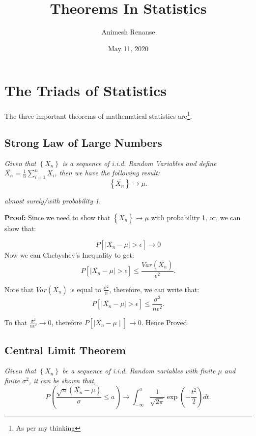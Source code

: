 \documentclass[a4paper]{article}
\title{Theorems In Statistics}
\author{Animesh Renanse}
\date{May 11, 2020}
\begin{document}
\maketitle
\newpage


\section{The Triads of  Statistics}

The three important theorems of mathematical statistics are\footnote{As per my thinking}.

\subsection{Strong Law of Large Numbers}

\textit{Given that $\left\{ X_n \right\} $ is a sequence of i.i.d. Random Variables and define $\overline{X_n} = \frac{1}{n}\sum_{i=1}^{n} X_i$, then we have the following result:}
\[
		\left\{ \overline{X_n} \right\}	\to \mu 	
.\]

\textit{almost surely/with probability 1}.


\textbf{Proof:} Since we need to show that $\left\{ \overline{X_n} \right\} \to \mu $ with probability 1, or, we can show that:

\[
		P \left[  \mid \overline{X_n}- \mu  \mid >  \epsilon  \right] \to  0
\]		
Now we can Chebyshev's Inequality to get:
\[
	P \left[  \mid \overline{X_n} - \mu  \mid > \epsilon \right] \le \frac{Var(\overline{X_n})}{\epsilon^{2}} 
.\] 

Note that $Var(\overline{X_n})$ is equal to $\frac{\sigma^2}{n}$, therefore, we can write that:
\[
	P \left[  \mid \overline{X_n} - \mu  \mid > \epsilon \right] \le \frac{\sigma^2}{n\epsilon^{2}} 
.\] 

To that $\frac{\sigma^2}{n\epsilon^2} \to 0$, therefore $P \left[  \mid \overline{X_n} - \mu  \mid  \right] \to 0 $.
Hence Proved.


\subsection{Central Limit Theorem}
\textit{Given that $\left\{ X_n \right\} $ be a sequence of i.i.d. Random variables with finite  $\mu$ and finite $\sigma^{2}$, it can be shown that,}
\[
P \left( \frac{\sqrt{n}\left( \overline{X_n} - \mu \right) } {\sigma}\le a \right) \to \int_{-\infty}^{a} \frac{1}{\sqrt{2\pi}} \exp \left(-\frac{t^2}{2}\right) dt
.\]
\end{document}
